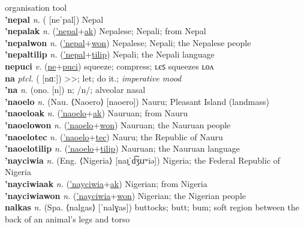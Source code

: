 organisation tool \label{netakiluat} \\
\textbf{'nepal} \textit{n.} ( [neˈpal])
Nepal \label{'nepal} \\
\textbf{'nepalak} \textit{n.} (\hyperref['nepal]{'nepal}+\hyperref[ak]{ak})
Nepalese; Nepali; from Nepal \label{'nepalak} \\
\textbf{'nepalwon} \textit{n.} (\hyperref['nepal]{'nepal}+\hyperref[won]{won})
Nepalese; Nepali; the Nepalese people \label{'nepalwon} \\
\textbf{'nepaltilip} \textit{n.} (\hyperref['nepal]{'nepal}+\hyperref[tilip]{tilip})
Nepali; the Nepali language \label{'nepaltilip} \\
\textbf{nepuci} \textit{v.} (\hyperref[ne]{ne}+\hyperref[puci]{puci})
squeeze; compress; ʟєꜱ squeezes ʟᴏᴧ \label{nepuci} \\
\textbf{na} \textit{ptcl.} ( [nɑː])
>>; let; do it.; \textit{imperative mood} \label{na} \\
\textbf{'na} \textit{n.} (ono. [n])
n; /n/; alveolar nasal \label{'na} \\
\textbf{'naoelo} \textit{n.} (Nau. ⟨Naoero⟩ [naoero])
Nauru; Pleasant Island (landmass) \label{'naoelo} \\
\textbf{'naoeloak} \textit{n.} (\hyperref['naoelo]{'naoelo}+\hyperref[ak]{ak})
Nauruan; from Nauru \label{'naoeloak} \\
\textbf{'naoelowon} \textit{n.} (\hyperref['naoelo]{'naoelo}+\hyperref[won]{won})
Nauruan; the Nauruan people \label{'naoelowon} \\
\textbf{'naoelotec} \textit{n.} (\hyperref['naoelo]{'naoelo}+\hyperref[tec]{tec})
Nauru; the Republic of Nauru \label{'naoelotec} \\
\textbf{'naoelotilip} \textit{n.} (\hyperref['naoelo]{'naoelo}+\hyperref[tilip]{tilip})
Nauruan; the Nauruan language \label{'naoelotilip} \\
\textbf{'nayciwia} \textit{n.} (Eng. ⟨Nigeria⟩ [naɪ̯ˈd͡ʒɪɹʷiə])
Nigeria; the Federal Republic of Nigeria \label{'nayciwia} \\
\textbf{'nayciwiaak} \textit{n.} (\hyperref['nayciwia]{'nayciwia}+\hyperref[ak]{ak})
Nigerian; from Nigeria \label{'nayciwiaak} \\
\textbf{'nayciwiawon} \textit{n.} (\hyperref['nayciwia]{'nayciwia}+\hyperref[won]{won})
Nigerian; the Nigerian people \label{'nayciwiawon} \\
\textbf{nalkas} \textit{n.} (Spa. ⟨nalgas⟩ [ˈnalɣas])
buttocks; butt; bum; soft region between the back of an animal’s legs and torso \label{nalkas} \\
